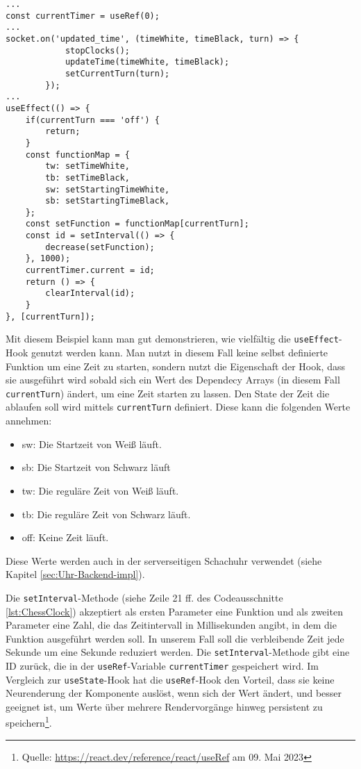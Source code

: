\begin{lstlisting}[style=codeStyle, caption={Ausschnitt der \textit{ChessClock}-Komponente}, label={lst:ChessClock}]
...
const currentTimer = useRef(0);
...
socket.on('updated_time', (timeWhite, timeBlack, turn) => {
            stopClocks();
            updateTime(timeWhite, timeBlack);
            setCurrentTurn(turn);
        });
...
useEffect(() => {
    if(currentTurn === 'off') {
        return;
    }
    const functionMap = {
        tw: setTimeWhite,
        tb: setTimeBlack,
        sw: setStartingTimeWhite,
        sb: setStartingTimeBlack,
    };
    const setFunction = functionMap[currentTurn];
    const id = setInterval(() => {
        decrease(setFunction);
    }, 1000);
    currentTimer.current = id;
    return () => {
        clearInterval(id);
    }
}, [currentTurn]);
\end{lstlisting}

Mit diesem Beispiel kann man gut demonstrieren, wie vielfältig die \verb|useEffect|-Hook genutzt werden kann. Man nutzt in diesem Fall keine selbst definierte Funktion um eine Zeit zu starten, sondern nutzt die Eigenschaft der Hook, dass sie ausgeführt wird sobald sich ein Wert des Dependecy Arrays (in diesem Fall \verb|currentTurn|) ändert, um eine Zeit starten zu lassen. Den State der Zeit die ablaufen soll wird mittels \verb|currentTurn| definiert. Diese kann die folgenden Werte annehmen:

\begin{itemize}
\item \glqq sw\grqq : Die Startzeit von Weiß läuft.
\item \glqq sb\grqq : Die Startzeit von Schwarz läuft
\item \glqq tw\grqq : Die reguläre Zeit von Weiß läuft.
\item \glqq tb\grqq : Die reguläre Zeit von Schwarz läuft.
\item \glqq off\grqq : Keine Zeit läuft.
\end{itemize}

Diese Werte werden auch in der serverseitigen Schachuhr verwendet (siehe Kapitel \ref{sec:Uhr-Backend-impl}).

Die \verb|setInterval|-Methode (siehe Zeile 21 ff. des Codeausschnitte \ref{lst:ChessClock}) akzeptiert als ersten Parameter eine Funktion und als zweiten Parameter eine Zahl, die das Zeitintervall in Millisekunden angibt, in dem die Funktion ausgeführt werden soll. In unserem Fall soll die verbleibende Zeit jede Sekunde um eine Sekunde reduziert werden. Die \verb|setInterval|-Methode gibt eine ID zurück, die in der \verb|useRef|-Variable \verb|currentTimer| gespeichert wird. Im Vergleich zur \verb|useState|-Hook hat die \verb|useRef|-Hook den Vorteil, dass sie keine Neurenderung der Komponente auslöst, wenn sich der Wert ändert, und besser geeignet ist, um Werte über mehrere Rendervorgänge hinweg persistent zu speichern\footnote{Quelle: \url{https://react.dev/reference/react/useRef} am 09. Mai 2023}.

